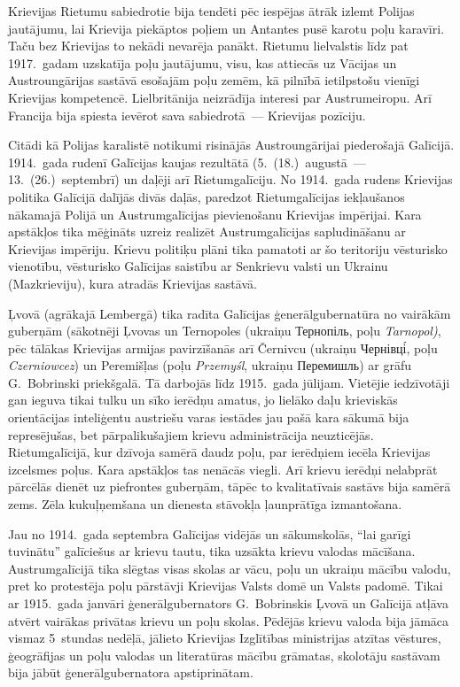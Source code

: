 \documentclass[twoside,a5paper,12pt,fleqn,openany]{extbook}
\newcommand{\pltxti}[1]{\textit{\textpolish{#1}}}
\newcommand{\uktxti}[1]{\textukrainian{#1}}
\begin{document}
Krievijas Rietumu sabiedrotie bija tendēti pēc iespējas ātrāk izlemt Polijas jautājumu, lai Krievija piekāptos poļiem un Antantes pusē karotu poļu karavīri. Taču bez Krievijas to nekādi nevarēja panākt. Rietumu lielvalstis līdz pat 1917.~gadam uzskatīja poļu jautājumu, visu, kas attiecās uz Vācijas un Austroungārijas sastāvā esošajām poļu zemēm, kā pilnībā ietilpstošu vienīgi Krievijas kompetencē. Lielbritānija neizrādīja interesi par Austrumeiropu. Arī Francija bija spiesta ievērot sava sabiedrotā~--- Krievijas pozīciju.

Citādi kā Polijas karalistē notikumi risinājās Austroungārijai piederošajā Galīcijā. 1914.~gada rudenī Galīcijas kaujas rezultātā (5.~(18.)~augustā~--- 13.~(26.)~septembrī)  un daļēji arī Rietumgalīciju. No 1914.~gada rudens Krievijas politika Galīcijā dalījās divās daļās, paredzot Rietumgalīcijas iekļaušanos nākamajā Polijā un Austrumgalīcijas pievienošanu Krievijas impērijai. Kara apstākļos tika mēģināts uzreiz realizēt Austrumgalīcijas sapludināšanu ar Krievijas impēriju. Krievu politiķu plāni tika pamatoti ar šo teritoriju vēsturisko vienotību, vēsturisko Galīcijas saistību ar Senkrievu valsti un Ukrainu (Mazkrieviju), kura atradās Krievijas sastāvā.

Ļvovā (agrākajā Lembergā) tika radīta Galīcijas ģenerālgubernatūra no vairākām guberņām (sākotnēji Ļvovas un Ternopoles (ukraiņu \uktxti{Тернопіль}, poļu \pltxti{Tarnopol)}, pēc tālākas Krievijas armijas pavirzīšanās arī Černivcu (ukraiņu \uktxti{Чернівці́}, poļu \pltxti{Czerniowcez}) un Peremišļas (poļu \pltxti{Przemyśl}, ukraiņu \uktxti{Перемишль}) ar grāfu G.~Bobrinski priekšgalā. Tā darbojās līdz 1915.~gada jūlijam. Vietējie iedzīvotāji gan ieguva tikai tulku un sīko ierēdņu amatus, jo lielāko daļu krieviskās orientācijas inteliģentu austriešu varas iestādes jau pašā kara sākumā bija represējušas, bet pārpalikušajiem krievu administrācija neuzticējās. Rietumgalīcijā, kur dzīvoja samērā daudz poļu, par ierēdņiem iecēla Krievijas izcelsmes poļus. Kara apstākļos tas nenācās viegli. Arī krievu ierēdņi nelabprāt pārcēlās dienēt uz piefrontes guberņām, tāpēc to kvalitatīvais sastāvs bija samērā zems. Zēla kukuļņemšana un dienesta stāvokļa ļaunprātīga izmantošana.

Jau no 1914.~gada septembra Galīcijas vidējās un sākumskolās, ``lai garīgi tuvinātu'' galīciešus ar krievu tautu, tika uzsākta krievu valodas mācīšana. Austrumgalīcijā tika slēgtas visas skolas ar vācu, poļu un ukraiņu mācību valodu, pret ko protestēja poļu pārstāvji Krievijas Valsts domē un Valsts padomē. Tikai ar 1915.~gada janvāri ģenerālgubernators G.~Bobrinskis Ļvovā un Galīcijā atļāva atvērt vairākas privātas krievu un poļu skolas. Pēdējās krievu valoda bija jāmāca vismaz 5~stundas nedēļā, jālieto Krievijas Izglītības ministrijas atzītas vēstures, ģeogrāfijas un poļu valodas un literatūras mācību grāmatas, skolotāju sastāvam bija jābūt ģenerālgubernatora apstiprinātam.
\end{document}
